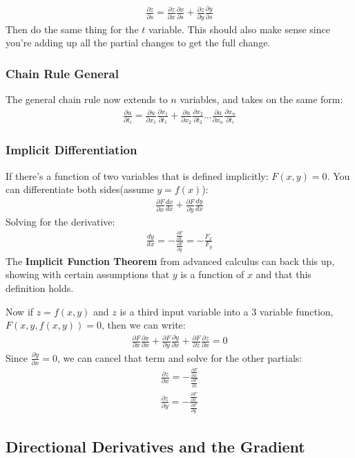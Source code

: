 \documentclass{article}
\newcommand{\p}{\partial}
\begin{document}
\begin{gather*}
    \frac{\p z}{\p s} = \frac{\p z}{\p x}\frac{\p x}{\p s} + \frac{\p z}{\p y}\frac{\p y}{\p s}
\end{gather*}
Then do the same thing for the $t$ variable. This should also make sense since you're adding up all the partial changes to get the full change.
\subsubsection{Chain Rule General}
The general chain rule now extends to $n$ variables, and takes on the same form:
\begin{gather*}
    \frac{\p u}{\p t_i} = \frac{\p u}{\p x_1}\frac{\p x_1}{\p t_1} + \frac{\p u}{\p x_2}\frac{\p x_2}{\p t_2}...\frac{\p u}{\p x_n}\frac{\p x_n}{\p t_i}
\end{gather*}
\subsubsection{Implicit Differentiation}
If there's a function of two variables that is defined implicitly: $F(x,y) = 0$. You can differentiate both sides(assume $y = f(x)$):
\begin{gather*}
    \frac{\p F}{\p x}\frac{dx}{dx} + \frac{\p F}{\p y}\frac{dy}{dx}
\end{gather*}
Solving for the derivative:
\begin{gather*}
    \frac{dy}{dx} = -\frac{\frac{\p F}{\p x}}{\frac{\p F}{\p y}} = -\frac{F_x}{F_y}
\end{gather*}
The \textbf{Implicit Function Theorem} from advanced calculus can back this up, showing with certain assumptions that $y$ is a function of $x$ and that this definition holds.

Now if $z = f(x,y)$ and $z$ is a third input variable into a 3 variable function, $F(x,y,f(x,y)) = 0$, then we can write:
\begin{gather*}
    \frac{\p F}{\p x}\frac{\p x}{\p x} + \frac{\p F}{\p y}\frac{\p y}{\p x} + \frac{\p F}{\p z}\frac{\p z}{\p x} = 0
\end{gather*}
Since $\frac{\p y}{\p x} = 0$, we can cancel that term and solve for the other partials:
\begin{gather*}
    \frac{\p z}{\p x} = -\frac{\frac{\p F}{\p x}}{\frac{\p F}{\p z}}\\
    \frac{\p z}{\p y} = -\frac{\frac{\p F}{\p x}}{\frac{\p F}{\p y}}
\end{gather*}
\subsection{Directional Derivatives and the Gradient}
\end{document}
